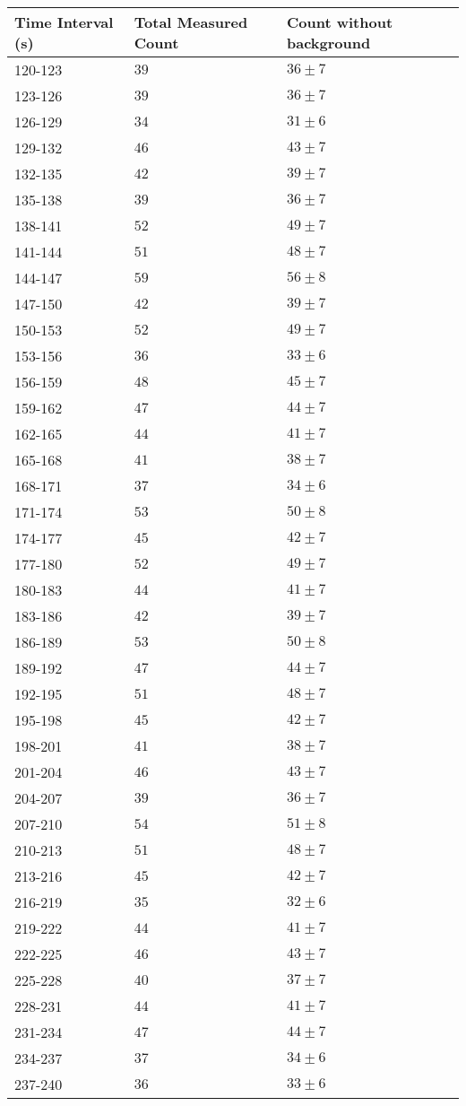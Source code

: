\begin{tabular}{| p{} | p{} | p{} |}\hline
Time Interval (s) & Total Measured Count & Count without background\\
\hline
120-123 & $39$ & $36\pm 7$\\
123-126 & $39$ & $36\pm 7$\\
126-129 & $34$ & $31\pm 6$\\
129-132 & $46$ & $43\pm 7$\\
132-135 & $42$ & $39\pm 7$\\
135-138 & $39$ & $36\pm 7$\\
138-141 & $52$ & $49\pm 7$\\
141-144 & $51$ & $48\pm 7$\\
144-147 & $59$ & $56\pm 8$\\
147-150 & $42$ & $39\pm 7$\\
150-153 & $52$ & $49\pm 7$\\
153-156 & $36$ & $33\pm 6$\\
156-159 & $48$ & $45\pm 7$\\
159-162 & $47$ & $44\pm 7$\\
162-165 & $44$ & $41\pm 7$\\
165-168 & $41$ & $38\pm 7$\\
168-171 & $37$ & $34\pm 6$\\
171-174 & $53$ & $50\pm 8$\\
174-177 & $45$ & $42\pm 7$\\
177-180 & $52$ & $49\pm 7$\\
180-183 & $44$ & $41\pm 7$\\
183-186 & $42$ & $39\pm 7$\\
186-189 & $53$ & $50\pm 8$\\
189-192 & $47$ & $44\pm 7$\\
192-195 & $51$ & $48\pm 7$\\
195-198 & $45$ & $42\pm 7$\\
198-201 & $41$ & $38\pm 7$\\
201-204 & $46$ & $43\pm 7$\\
204-207 & $39$ & $36\pm 7$\\
207-210 & $54$ & $51\pm 8$\\
210-213 & $51$ & $48\pm 7$\\
213-216 & $45$ & $42\pm 7$\\
216-219 & $35$ & $32\pm 6$\\
219-222 & $44$ & $41\pm 7$\\
222-225 & $46$ & $43\pm 7$\\
225-228 & $40$ & $37\pm 7$\\
228-231 & $44$ & $41\pm 7$\\
231-234 & $47$ & $44\pm 7$\\
234-237 & $37$ & $34\pm 6$\\
237-240 & $36$ & $33\pm 6$\\
\hline
\end{tabular}\\
